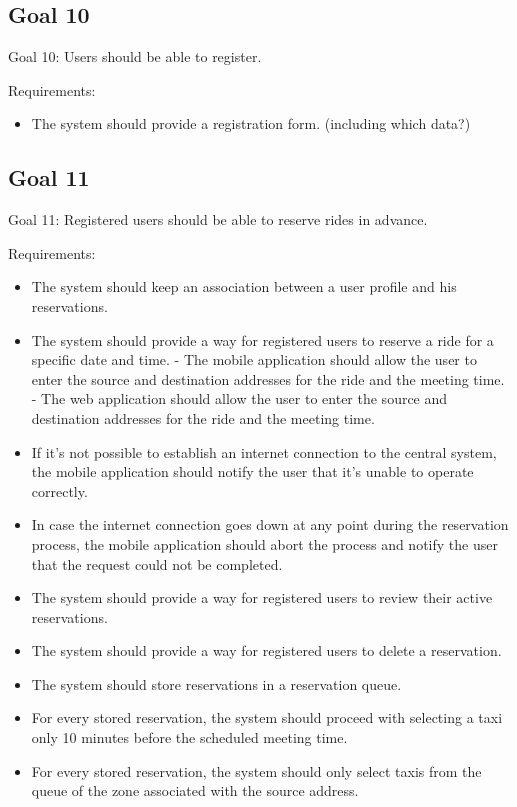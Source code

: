 \subsection{Goal 10}
Goal 10: Users should be able to register.

Requirements:
\begin{itemize}
\item The system should provide a registration form. (including which data?)
\end{itemize}

\subsection{Goal 11}
Goal 11: Registered users should be able to reserve rides in advance.

Requirements:
\begin{itemize}
\item The system should keep an association between a user profile and his reservations.
\item The system should provide a way for registered users to reserve a ride for a specific date and time.
	- The mobile application should allow the user to enter the source and destination addresses for the ride and the meeting time.
	- The web application should allow the user to enter the source and destination addresses for the ride and the meeting time.
\item If it’s not possible to establish an internet connection to the central system, the mobile application should notify the user that it’s unable to operate correctly.
\item In case the internet connection goes down at any point during the reservation process, the mobile application should abort the process and notify the user that the request could not be completed.
\item The system should provide a way for registered users to review their active reservations.
\item The system should provide a way for registered users to delete a reservation.
\item The system should store reservations in a reservation queue. 
\item For every stored reservation, the system should proceed with selecting a taxi only 10 minutes before the scheduled meeting time.
\item For every stored reservation, the system should only select taxis from the queue of the zone associated with the source address.

\end{itemize}
